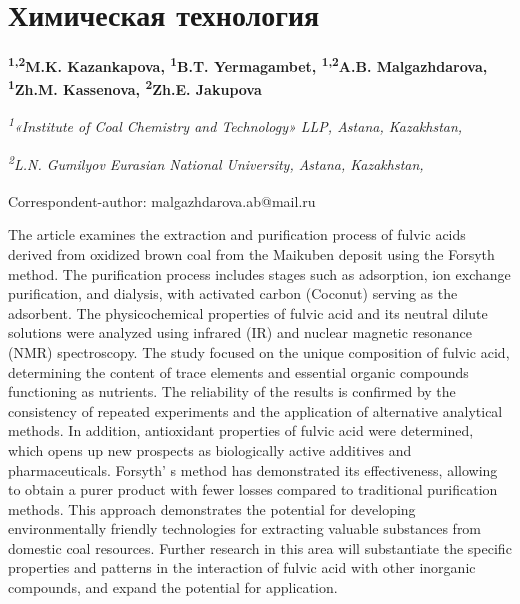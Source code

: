 \let\cleardoublepage\clearpage
\chapter{Химическая технология}

\begin{articleheader}

{\bfseries
\textsuperscript{1,2}M.K. Kazankapova\authorid,
\textsuperscript{1}B.T. Yermagambet\authorid,
\textsuperscript{1,2}A.B. Malgazhdarova\textsuperscript{\envelope }\authorid,
\textsuperscript{1}Zh.M. Kassenova\authorid,
\textsuperscript{2}Zh.E. Jakupova\authorid}
\end{articleheader}

\begin{affiliation}
\emph{\textsuperscript{1}«Institute of Coal Chemistry and Technology» LLP, Astana, Kazakhstan,}

\emph{\textsuperscript{2}L.N. Gumilyov Eurasian National University, Astana, Kazakhstan,}

\raggedright {\bfseries \textsuperscript{\envelope }}Correspondent-author: malgazhdarova.ab@mail.ru
\end{affiliation}

The article examines the extraction and purification process of fulvic
acids derived from oxidized brown coal from the Maikuben deposit using
the Forsyth method. The purification process includes stages such as
adsorption, ion exchange purification, and dialysis, with activated
carbon (Coconut) serving as the adsorbent. The physicochemical
properties of fulvic acid and its neutral dilute solutions were analyzed
using infrared (IR) and nuclear magnetic resonance (NMR) spectroscopy.
The study focused on the unique composition of fulvic acid, determining
the content of trace elements and essential organic compounds
functioning as nutrients. The reliability of the results is confirmed by
the consistency of repeated experiments and the application of
alternative analytical methods. In addition, antioxidant properties of
fulvic acid were determined, which opens up new prospects as
biologically active additives and pharmaceuticals.
Forsyth' s method has demonstrated its effectiveness,
allowing to obtain a purer product with fewer losses compared to
traditional purification methods. This approach demonstrates the
potential for developing environmentally friendly technologies for
extracting valuable substances from domestic coal resources. Further
research in this area will substantiate the specific properties and
patterns in the interaction of fulvic acid with other inorganic
compounds, and expand the potential for application.

